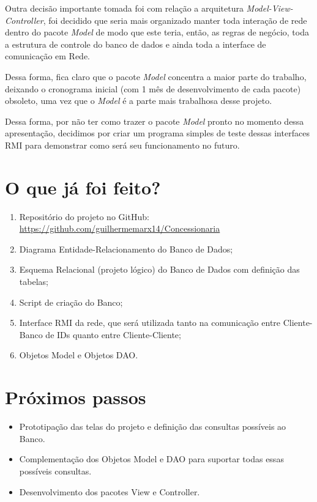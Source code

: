 \documentclass[brazil, a4paper,12pt]{article}
\begin{document}
Outra decisão importante tomada foi com relação a arquitetura \emph{Model-View-Controller}, foi decidido que seria mais organizado manter toda interação de rede dentro do pacote \emph{Model} de modo que este teria, então, as regras de negócio, toda a estrutura de controle do banco de dados e ainda toda a interface de comunicação em Rede. 

Dessa forma, fica claro que o pacote \emph{Model} concentra a maior parte do trabalho, deixando o cronograma inicial (com 1 mês de desenvolvimento de cada pacote) obsoleto, uma vez que o \emph{Model} é a parte mais trabalhosa desse projeto.

Dessa forma, por não ter como trazer o pacote \emph{Model} pronto no momento dessa apresentação, decidimos por criar um programa simples de teste dessas interfaces RMI para demonstrar como será seu funcionamento no futuro.

\section{O que já foi feito?}
\begin{enumerate}
	\item Repositório do projeto no GitHub: \url{https://github.com/guilhermemarx14/Concessionaria}
	\item Diagrama Entidade-Relacionamento do Banco de Dados;
	\item Esquema Relacional (projeto lógico) do Banco de Dados com definição das tabelas;
	\item Script de criação do Banco;
	\item Interface RMI da rede, que será utilizada tanto na comunicação entre Cliente-Banco de IDs quanto entre Cliente-Cliente;
	\item Objetos Model e Objetos DAO.
\end{enumerate}

\section{Próximos passos}
\begin{itemize}
	\item Prototipação das telas do projeto e definição das consultas possíveis ao Banco.
	\item Complementação dos Objetos Model e DAO para suportar todas essas possíveis consultas.
	\item Desenvolvimento dos pacotes View e Controller.
\end{itemize}
\end{document}
